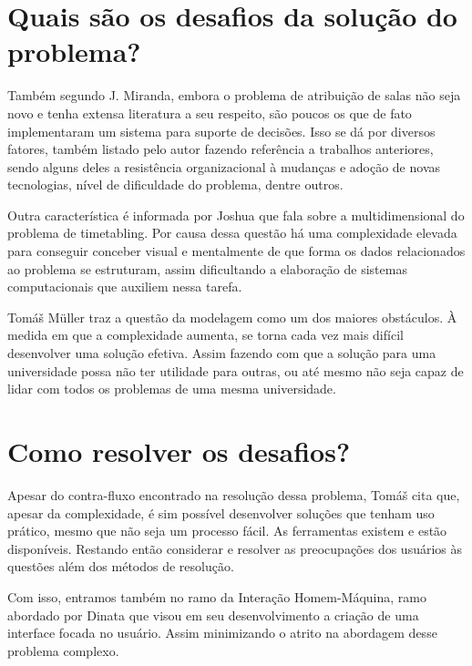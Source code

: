         
    
    \section{Quais são os desafios da solução do problema?}
        
        Também segundo J. Miranda, embora o problema de atribuição de salas não seja novo e tenha extensa literatura a seu respeito, são poucos os que de fato implementaram um sistema para suporte de decisões. Isso se dá por diversos fatores, também listado pelo autor fazendo referência a trabalhos anteriores, sendo alguns deles a resistência organizacional à mudanças e adoção de novas tecnologias, nível de dificuldade do problema, dentre outros.
        
        
        Outra característica é informada por Joshua \cite{THOMAS2009} que fala sobre a multidimensional do problema de timetabling. Por causa dessa questão há uma complexidade elevada para conseguir conceber visual e mentalmente de que forma os dados relacionados ao problema se estruturam, assim dificultando a elaboração de sistemas computacionais que auxiliem nessa tarefa.
        
        Tomáš Müller \cite{MURRAY2007} traz a questão da modelagem como um dos maiores obstáculos. À medida em que a complexidade aumenta, se torna cada vez mais difícil desenvolver uma solução efetiva. Assim fazendo com que a solução para uma universidade possa não ter utilidade para outras, ou até mesmo não seja capaz de lidar com todos os problemas de uma mesma universidade.
    
    \section{Como resolver os desafios?}
        
        Apesar do contra-fluxo encontrado na resolução dessa problema, Tomáš cita que, apesar da complexidade, é sim possível desenvolver soluções que tenham uso prático, mesmo que não seja um processo fácil. As ferramentas existem e estão disponíveis. Restando então considerar e resolver as preocupações dos usuários às questões além dos métodos de resolução.
        
        Com isso, entramos também no ramo da Interação Homem-Máquina, ramo abordado por Dinata \cite{ANDRE2018} que visou em seu desenvolvimento a criação de uma interface focada no usuário. Assim minimizando o atrito na abordagem desse problema complexo.
